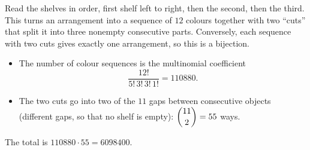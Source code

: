 Read the shelves in order, first shelf left to right, then the second, then the third. This turns an arrangement into a sequence of $12$ colours together with two ``cuts'' that split it into three nonempty consecutive parts. Conversely, each sequence with two cuts gives exactly one arrangement, so this is a bijection.

\begin{itemize}
\item The number of colour sequences is the multinomial coefficient
\[\dfrac{12!}{5!\,3!\,3!\,1!}=110880.\]
\item The two cuts go into two of the $11$ gaps between consecutive objects (different gaps, so that no shelf is empty): $\dbinom{11}{2}=55$ ways.
\end{itemize}
The total is $110880\cdot55=\boxed{6098400}$.
